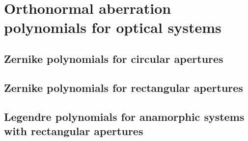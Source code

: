 \appendix

\chapter{Orthonormal aberration polynomials for optical systems}
\label{sec:appendix_poly}

\section{Zernike polynomials for circular apertures}
\section{Zernike polynomials for rectangular apertures}
\section{Legendre polynomials for anamorphic systems with rectangular apertures}

